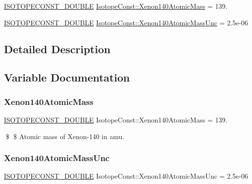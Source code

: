 \begin{DoxyCompactItemize}
\item 
\mbox{\hyperlink{group___isotope_const-_macros_ga8f45a7272ce02c0b4c65c44636ed719a}{I\+S\+O\+T\+O\+P\+E\+C\+O\+N\+S\+T\+\_\+\+D\+O\+U\+B\+LE}} \mbox{\hyperlink{group___isotope_const-_xenon-_xe140_ga8e71942fdd040a967453469a8343076e}{Isotope\+Const\+::\+Xenon140\+Atomic\+Mass}} = 139.
\item 
\mbox{\hyperlink{group___isotope_const-_macros_ga8f45a7272ce02c0b4c65c44636ed719a}{I\+S\+O\+T\+O\+P\+E\+C\+O\+N\+S\+T\+\_\+\+D\+O\+U\+B\+LE}} \mbox{\hyperlink{group___isotope_const-_xenon-_xe140_gad0414e189e2e8d12f7dc683531a5568e}{Isotope\+Const\+::\+Xenon140\+Atomic\+Mass\+Unc}} = 2.\+5e-\/06
\end{DoxyCompactItemize}


\subsection{Detailed Description}


\subsection{Variable Documentation}
\mbox{\label{group___isotope_const-_xenon-_xe140_ga8e71942fdd040a967453469a8343076e}} 
\subsubsection{\texorpdfstring{Xenon140\+Atomic\+Mass}{Xenon140AtomicMass}}
{\footnotesize\ttfamily \mbox{\hyperlink{group___isotope_const-_macros_ga8f45a7272ce02c0b4c65c44636ed719a}{I\+S\+O\+T\+O\+P\+E\+C\+O\+N\+S\+T\+\_\+\+D\+O\+U\+B\+LE}} Isotope\+Const\+::\+Xenon140\+Atomic\+Mass = 139.}

\$ \$ Atomic mass of Xenon-\/140 in amu. \mbox{\label{group___isotope_const-_xenon-_xe140_gad0414e189e2e8d12f7dc683531a5568e}} 
\subsubsection{\texorpdfstring{Xenon140\+Atomic\+Mass\+Unc}{Xenon140AtomicMassUnc}}
{\footnotesize\ttfamily \mbox{\hyperlink{group___isotope_const-_macros_ga8f45a7272ce02c0b4c65c44636ed719a}{I\+S\+O\+T\+O\+P\+E\+C\+O\+N\+S\+T\+\_\+\+D\+O\+U\+B\+LE}} Isotope\+Const\+::\+Xenon140\+Atomic\+Mass\+Unc = 2.\+5e-\/06}


